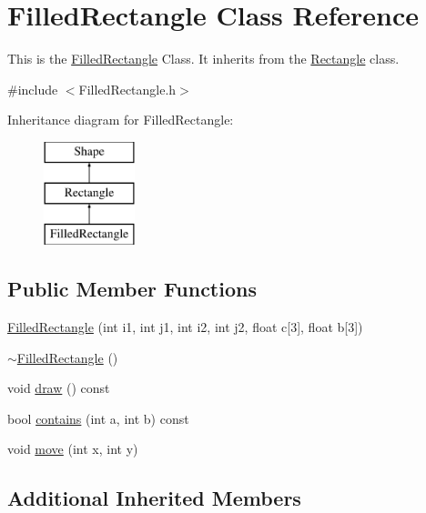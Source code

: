 \hypertarget{classFilledRectangle}{\section{Filled\-Rectangle Class Reference}
\label{classFilledRectangle}
}


This is the \hyperlink{classFilledRectangle}{Filled\-Rectangle} Class. It inherits from the \hyperlink{classRectangle}{Rectangle} class.  




{\ttfamily \#include $<$Filled\-Rectangle.\-h$>$}

Inheritance diagram for Filled\-Rectangle\-:\begin{figure}[H]
\begin{center}
\leavevmode
\includegraphics[height=3.000000cm]{classFilledRectangle}
\end{center}
\end{figure}
\subsection*{Public Member Functions}
\begin{DoxyCompactItemize}
\item 
\hyperlink{classFilledRectangle_af486107ac4b31342ab021e9953daa244}{Filled\-Rectangle} (int i1, int j1, int i2, int j2, float c\mbox{[}3\mbox{]}, float b\mbox{[}3\mbox{]})
\item 
\hyperlink{classFilledRectangle_a56e0054800fc14cf782591c19545e07b}{$\sim$\-Filled\-Rectangle} ()
\item 
void \hyperlink{classFilledRectangle_a49851c7d17a59e69c78e8957e25b5aec}{draw} () const 
\item 
bool \hyperlink{classFilledRectangle_a7db0492e684aee027407af324db12f5e}{contains} (int a, int b) const 
\item 
void \hyperlink{classFilledRectangle_acbf15e9451754a1ab873c97decf6718b}{move} (int x, int y)
\end{DoxyCompactItemize}
\subsection*{Additional Inherited Members}



